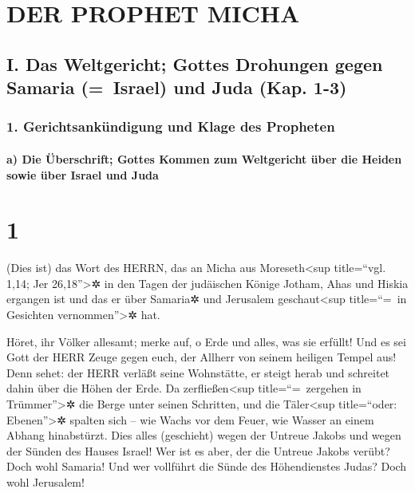 \hypertarget{der-prophet-micha}{%
\section{DER PROPHET MICHA}\label{der-prophet-micha}}

\hypertarget{i.-das-weltgericht-gottes-drohungen-gegen-samaria-israel-und-juda-kap.-1-3}{%
\subsection{I. Das Weltgericht; Gottes Drohungen gegen Samaria
(=~Israel) und Juda (Kap.
1-3)}\label{i.-das-weltgericht-gottes-drohungen-gegen-samaria-israel-und-juda-kap.-1-3}}

\hypertarget{gerichtsankuxfcndigung-und-klage-des-propheten}{%
\subsubsection{1. Gerichtsankündigung und Klage des
Propheten}\label{gerichtsankuxfcndigung-und-klage-des-propheten}}

\hypertarget{a-die-uxfcberschrift-gottes-kommen-zum-weltgericht-uxfcber-die-heiden-sowie-uxfcber-israel-und-juda}{%
\paragraph{a) Die Überschrift; Gottes Kommen zum Weltgericht über die
Heiden sowie über Israel und
Juda}\label{a-die-uxfcberschrift-gottes-kommen-zum-weltgericht-uxfcber-die-heiden-sowie-uxfcber-israel-und-juda}}

\hypertarget{section}{%
\section{1}\label{section}}

 (Dies ist) das Wort des HERRN, das an Micha aus
Moreseth\textless sup title=``vgl. 1,14; Jer 26,18''\textgreater✲ in den
Tagen der judäischen Könige Jotham, Ahas und Hiskia ergangen ist und das
er über Samaria✲ und Jerusalem geschaut\textless sup title=``=~in
Gesichten vernommen''\textgreater✲ hat.

 Höret, ihr Völker allesamt; merke auf, o Erde und alles,
was sie erfüllt! Und es sei Gott der HERR Zeuge gegen euch, der Allherr
von seinem heiligen Tempel aus!  Denn sehet: der HERR
verläßt seine Wohnstätte, er steigt herab und schreitet dahin über die
Höhen der Erde.  Da zerfließen\textless sup
title=``=~zergehen in Trümmer''\textgreater✲ die Berge unter seinen
Schritten, und die Täler\textless sup title=``oder:
Ebenen''\textgreater✲ spalten sich -- wie Wachs vor dem Feuer, wie
Wasser an einem Abhang hinabstürzt.  Dies alles
(geschieht) wegen der Untreue Jakobs und wegen der Sünden des Hauses
Israel! Wer ist es aber, der die Untreue Jakobs verübt? Doch wohl
Samaria! Und wer vollführt die Sünde des Höhendienstes Judas? Doch wohl
Jerusalem!

